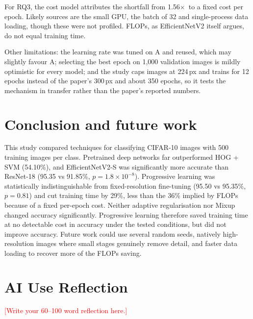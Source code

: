 \documentclass[10pt,twocolumn]{article}
\newcommand{\sx}{$\times$}
\newcommand{\todo}[1]{\textcolor{red}{#1}}
\begin{document}
For RQ3, the cost model attributes the shortfall from 1.56\sx\ to a fixed cost per epoch. Likely
sources are the small GPU, the batch of 32 and single-process data loading, though these were not
profiled. FLOPs, as EfficientNetV2 itself argues, do not equal training time.

Other limitations: the learning rate was tuned on A and reused, which may slightly favour A; selecting
the best epoch on 1{,}000 validation images is mildly optimistic for every model; and the study caps
images at 224\,px and trains for 12 epochs instead of the paper's 300\,px and about 350 epochs, so it
tests the mechanism in transfer rather than the paper's reported numbers.

\section{Conclusion and future work}
This study compared techniques for classifying CIFAR-10 images with 500 training images per class.
Pretrained deep networks far outperformed HOG + SVM (54.10\%), and EfficientNetV2-S was significantly
more accurate than ResNet-18 (95.35 vs 91.85\%, $p=1.8{\times}10^{-8}$). Progressive learning was
statistically indistinguishable from fixed-resolution fine-tuning (95.50 vs 95.35\%, $p=0.81$) and cut
training time by 29\%, less than the 36\% implied by FLOPs because of a fixed per-epoch cost. Neither
adaptive regularisation nor Mixup changed accuracy significantly. Progressive learning therefore saved
training time at no detectable cost in accuracy under the tested conditions, but did not improve
accuracy. Future work could use several random seeds, natively high-resolution images where small
stages genuinely remove detail, and faster data loading to recover more of the FLOPs saving.

\section{AI Use Reflection}
\todo{[Write your 60--100 word reflection here.]}
\end{document}
